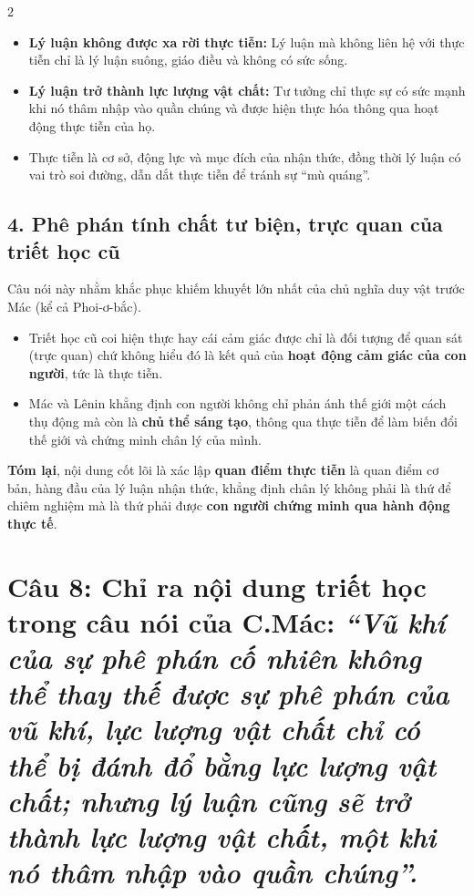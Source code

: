 \documentclass[9pt,a4paper]{extarticle}
\begin{document}
\begin{multicols*}{2}
\begin{itemize}
\item \textbf{Lý luận không được xa rời thực tiễn:} Lý luận mà không liên hệ với thực tiễn chỉ là lý luận suông, giáo điều và không có sức sống.
\item \textbf{Lý luận trở thành lực lượng vật chất:} Tư tưởng chỉ thực sự có sức mạnh khi nó thâm nhập vào quần chúng và được hiện thực hóa thông qua hoạt động thực tiễn của họ.
\item Thực tiễn là cơ sở, động lực và mục đích của nhận thức, đồng thời lý luận có vai trò soi đường, dẫn dắt thực tiễn để tránh sự ``mù quáng''.
\end{itemize}

\subsection*{4. Phê phán tính chất tư biện, trực quan của triết học cũ}

Câu nói này nhằm khắc phục khiếm khuyết lớn nhất của chủ nghĩa duy vật trước Mác (kể cả Phoi-ơ-bắc).

\begin{itemize}
\item Triết học cũ coi hiện thực hay cái cảm giác được chỉ là đối tượng để quan sát (trực quan) chứ không hiểu đó là kết quả của \textbf{hoạt động cảm giác của con người}, tức là thực tiễn.
\item Mác và Lênin khẳng định con người không chỉ phản ánh thế giới một cách thụ động mà còn là \textbf{chủ thể sáng tạo}, thông qua thực tiễn để làm biến đổi thế giới và chứng minh chân lý của mình.
\end{itemize}

\textbf{Tóm lại}, nội dung cốt lõi là xác lập \textbf{quan điểm thực tiễn} là quan điểm cơ bản, hàng đầu của lý luận nhận thức, khẳng định chân lý không phải là thứ để chiêm nghiệm mà là thứ phải được \textbf{con người chứng minh qua hành động thực tế}.

\section*{Câu 8: Chỉ ra nội dung triết học trong câu nói của C.Mác: \textit{``Vũ khí của sự phê phán cố nhiên không thể thay thế được sự phê phán của vũ khí, lực lượng vật chất chỉ có thể bị đánh đổ bằng lực lượng vật chất; nhưng lý luận cũng sẽ trở thành lực lượng vật chất, một khi nó thâm nhập vào quần chúng''.}}


\end{multicols*}
\end{document}
